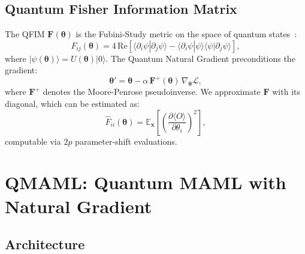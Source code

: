 \documentclass[a4paper,nopdfoutputerror]{quantumarticle}
\begin{document}
\subsection{Quantum Fisher Information Matrix}

The QFIM $\mathbf{F}(\boldsymbol{\theta})$ is the Fubini-Study metric
on the space of quantum states~\cite{stokes2020quantum,meyer2021fisher}:
\begin{equation}
  F_{ij}(\boldsymbol{\theta})
    = 4\,\mathrm{Re}\!\left[
        \langle \partial_i \psi | \partial_j \psi \rangle
        - \langle \partial_i \psi | \psi \rangle
          \langle \psi | \partial_j \psi \rangle
      \right],
\end{equation}
where $|\psi(\boldsymbol{\theta})\rangle = U(\boldsymbol{\theta})|0\rangle$.
The Quantum Natural Gradient preconditions the gradient:
\begin{equation}
  \boldsymbol{\theta}' = \boldsymbol{\theta}
    - \alpha\, \mathbf{F}^{+}(\boldsymbol{\theta})\,
      \nabla_{\boldsymbol{\theta}} \mathcal{L},
\end{equation}
where $\mathbf{F}^{+}$ denotes the Moore-Penrose pseudoinverse.
We approximate $\mathbf{F}$ with its diagonal, which can be estimated as:
\begin{equation}
  \hat{F}_{ii}(\boldsymbol{\theta})
    = \mathbb{E}_{\mathbf{x}}\!\left[
        \left(\frac{\partial \langle O \rangle}{\partial \theta_i}\right)^{\!2}
      \right],
  \label{eq:qfim_diag}
\end{equation}
computable via $2p$ parameter-shift evaluations.

\section{QMAML: Quantum MAML with Natural Gradient}
\label{sec:method}

\subsection{Architecture}
\end{document}
